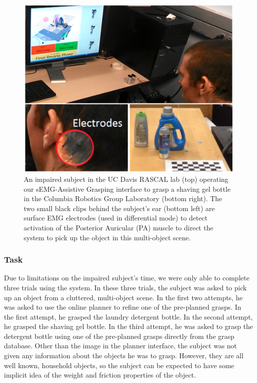 \begin{figure}
\centering
\includegraphics[width=.99\columnwidth]{user_semg.png}
\caption{An impaired subject in the UC Davis RASCAL
lab (top) operating our sEMG-Assistive Grasping interface
to grasp a shaving gel bottle in the Columbia Robotics
Group Laboratory (bottom right). The two small black clips
behind the subject’s ear (bottom left) are surface EMG
electrodes (used in differential mode) to detect activation of
the Posterior Auricular (PA) muscle to direct the system to
pick up the object in this multi-object scene.}
\label{fig:user-semg}
\end{figure}


\subsubsection{Task}
Due to limitations on the impaired subject's time, we were only able to complete three trials using the system. In these three trials,  the subject was asked to pick up an object from a cluttered, multi-object scene. In the first two attempts, he was asked to use the online planner to refine one of the pre-planned grasps. In the first attempt, he grasped the laundry detergent bottle. In the second attempt, he grasped the shaving gel bottle. In the third attempt, he was asked to grasp the detergent bottle using one of the pre-planned grasps directly from the grasp database. Other than the image in the planner interface, the subject was not given any information about the objects he was to grasp. However, they are all well known, household objects, so the subject can be expected to have some implicit idea of the weight and friction properties of the object. 


